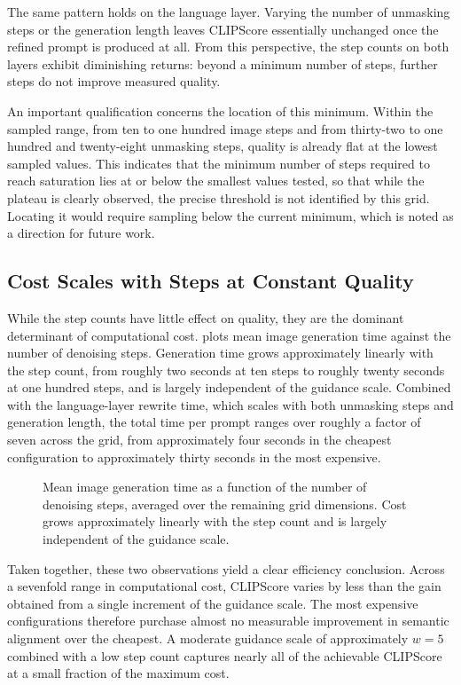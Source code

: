 \documentclass[a4paper,twoside,12pt]{report}
\begin{document}
The same pattern holds on the language layer. Varying the number of unmasking
steps or the generation length leaves CLIPScore essentially unchanged once the
refined prompt is produced at all. From this perspective, the step counts on
both layers exhibit diminishing returns: beyond a minimum number of steps,
further steps do not improve measured quality.

An important qualification concerns the location of this minimum. Within the
sampled range, from ten to one hundred image steps and from thirty-two to one
hundred and twenty-eight unmasking steps, quality is already flat at the lowest
sampled values. This indicates that the minimum number of steps required to
reach saturation lies at or below the smallest values tested, so that while the
plateau is clearly observed, the precise threshold is not identified by this
grid. Locating it would require sampling below the current minimum, which is
noted as a direction for future work.

\subsection{Cost Scales with Steps at Constant Quality}

While the step counts have little effect on quality, they are the dominant
determinant of computational cost.  plots mean image
generation time against the number of denoising steps. Generation time grows
approximately linearly with the step count, from roughly two seconds at ten
steps to roughly twenty seconds at one hundred steps, and is largely independent
of the guidance scale. Combined with the language-layer rewrite time, which
scales with both unmasking steps and generation length, the total time per
prompt ranges over roughly a factor of seven across the grid, from
approximately four seconds in the cheapest configuration to approximately thirty
seconds in the most expensive.

\begin{figure}[H]
\centering
\caption[Generation cost versus image steps]{Mean image generation time as a
function of the number of denoising steps, averaged over the remaining grid
dimensions. Cost grows approximately linearly with the step count and is
largely independent of the guidance scale.}
\label{fig:rq6_time}
\end{figure}

Taken together, these two observations yield a clear efficiency conclusion.
Across a sevenfold range in computational cost, CLIPScore varies by less than
the gain obtained from a single increment of the guidance scale. The most
expensive configurations therefore purchase almost no measurable improvement in
semantic alignment over the cheapest. A moderate guidance scale of
approximately \(w = 5\) combined with a low step count captures nearly all of
the achievable CLIPScore at a small fraction of the maximum cost.
\end{document}
